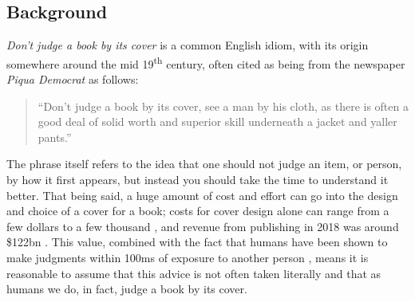\documentclass[12pt]{article}
\numberwithin{equation}{section}
\numberwithin{figure}{section}
\begin{document}
\subsection{Background} %
\label{sub:background}
\emph{Don't judge a book by its cover} is a common English idiom, with its origin somewhere around the mid 19\textsuperscript{th} century, often cited as being from the newspaper \emph{Piqua Democrat} as follows:
\begin{quote}
	``Don’t judge a book by its cover, see a man by his cloth, as there is often a good deal of solid worth and superior skill underneath a jacket and yaller pants.''
\end{quote}
The phrase itself refers to the idea that one should not judge an item, or person, by how it first appears, but instead you should take the time to understand it better. That being said, a huge amount of cost and effort can go into the design and choice of a cover for a book; costs for cover design alone can range from a few dollars to a few thousand \cite{AdriasG}, and revenue from publishing in 2018 was around \$122bn \cite{Watson}. This value, combined with the fact that humans have been shown to make judgments within 100ms of exposure to another person \cite{Willis2006}, means it is reasonable to assume that this advice is not often taken literally and that as humans we do, in fact, judge a book by its cover.
\end{document}
